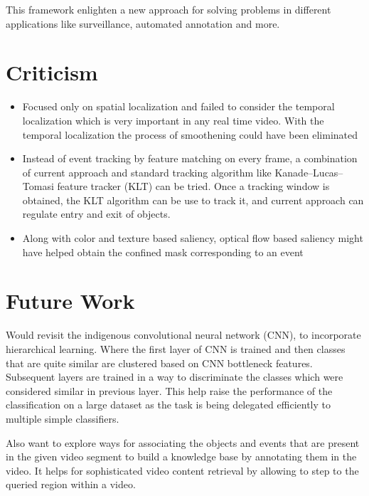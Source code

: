\par This framework enlighten a new approach for solving problems in different applications like surveillance, automated annotation and more.

\section{Criticism}
\begin{itemize}
	\item{Focused only on spatial localization and failed to consider the temporal localization which is very important in any real time video. With the temporal localization the process of smoothening could have been eliminated}
	\item{Instead of event tracking by feature matching on every frame, a combination of current approach and standard tracking algorithm like Kanade–Lucas–Tomasi feature tracker (KLT) can be tried. Once a tracking window is obtained, the KLT algorithm can be use to track it, and current approach can regulate entry and exit of objects.}
	\item{Along with color and texture based saliency, optical flow based saliency might have helped obtain the confined mask corresponding to an event}
\end{itemize}
\clearpage 
\section{Future Work}
Would revisit the indigenous convolutional neural network (CNN), to incorporate hierarchical learning. Where the first layer of CNN is trained and then classes that are quite similar are clustered based on CNN bottleneck features. Subsequent layers are trained in a way to discriminate the classes which were considered similar in previous layer. This help raise the performance of the classification on a large dataset as the task is being delegated efficiently to multiple simple classifiers.
\par Also want to explore ways for associating the objects and events that are present in the given video segment to build a knowledge base by annotating them in the video. It helps for sophisticated video content retrieval by allowing to step to the queried region within a video.